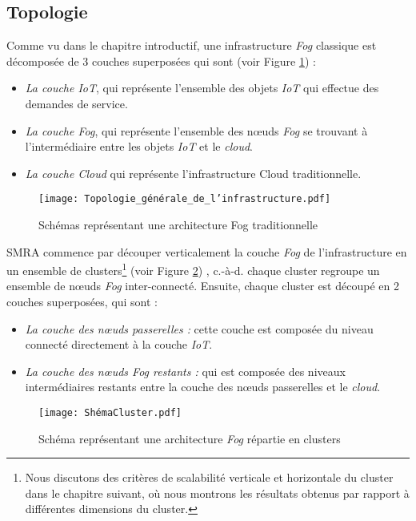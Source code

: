 \subsection{Topologie}
Comme vu dans le chapitre introductif, une infrastructure \emph{Fog} classique est décomposée de 3 couches superposées qui sont (voir Figure \ref{fig:Topologie_generale_de_linfrastructure}) :
\begin{itemize}
    \item \emph{La couche IoT}, qui représente l'ensemble des objets \emph{IoT} qui effectue des demandes de service.
    \item \emph{La couche Fog}, qui représente l'ensemble des nœuds \emph{Fog} se trouvant à l'intermédiaire entre les objets \emph{IoT} et le \emph{cloud}.
    \item \emph{La couche Cloud} qui représente l'infrastructure Cloud traditionnelle.
\end{itemize}
\begin{figure}[H]
    \centering
    \texttt{[image: Topologie\_générale\_de\_l'infrastructure.pdf]}
    \caption{Schémas représentant une architecture Fog traditionnelle}
    \label{fig:Topologie_generale_de_linfrastructure}
\end{figure}
\par SMRA commence par découper verticalement la couche \emph{Fog} de l'infrastructure en un ensemble de clusters\footnote{Nous discutons des critères de scalabilité verticale et horizontale du cluster dans le chapitre suivant, où nous montrons les résultats obtenus par rapport à différentes dimensions du cluster.} (voir Figure \ref{fig:Infrastructure_fog_repartie_en_cluster}) , c.-à-d. chaque cluster regroupe un ensemble de nœuds \emph{Fog} inter-connecté. Ensuite, chaque cluster est découpé en 2 couches superposées, qui sont :
\begin{itemize}
    \item \emph{La couche des nœuds passerelles :}  cette couche est composée du niveau connecté directement à la couche \emph{IoT}.
    \item \emph{La couche des nœuds Fog restants :} qui est composée des niveaux intermédiaires restants entre la couche des nœuds passerelles et le \emph{cloud}.
\end{itemize}
\begin{figure}[H]
    \centering
    \texttt{[image: ShémaCluster.pdf]}
    \caption{Schéma représentant une architecture \emph{Fog} répartie en clusters}
    \label{fig:Infrastructure_fog_repartie_en_cluster}
\end{figure}

